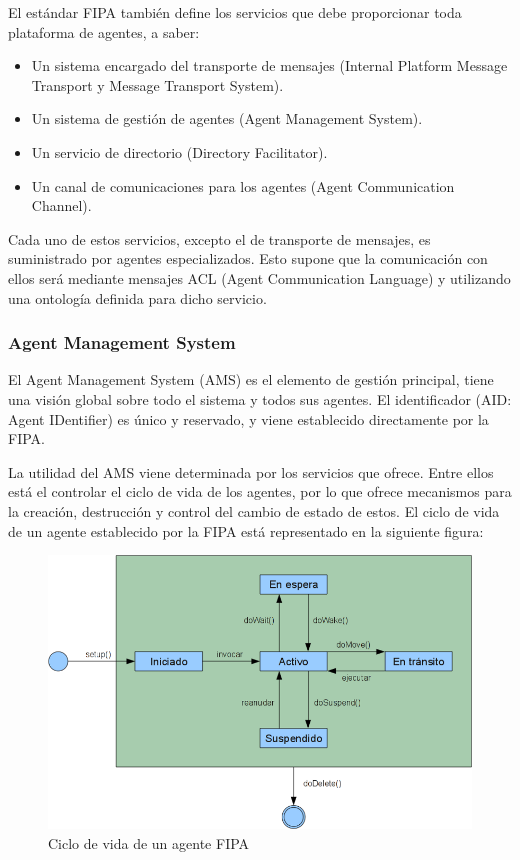 El estándar FIPA también define los servicios que debe proporcionar toda
plataforma de agentes, a saber:

\begin{itemize}
 \item Un sistema encargado del transporte de mensajes (Internal Platform
 Message Transport y Message Transport System).
 \item Un sistema de gestión de agentes (Agent Management System).
 \item Un servicio de directorio (Directory Facilitator).
 \item Un canal de comunicaciones para los agentes (Agent Communication
 Channel).
\end{itemize}

Cada uno de estos servicios, excepto el de transporte de mensajes, es
suministrado por agentes especializados. Esto supone que la comunicación con
ellos será mediante mensajes ACL (Agent Communication Language) y utilizando una
ontología definida para dicho servicio.

\subsubsection{Agent Management System}

El Agent Management System (AMS) es el elemento de gestión principal, tiene una
visión global sobre todo el sistema y todos sus agentes. El identificador (AID:
Agent IDentifier) es único y reservado, y viene establecido directamente por la
FIPA.

La utilidad del AMS viene determinada por los servicios que ofrece. Entre ellos
está el controlar el ciclo de vida de los agentes, por lo que ofrece mecanismos
para la creación, destrucción y control del cambio de estado de estos. El ciclo
de vida de un agente establecido por la FIPA está representado en la siguiente
figura:

\begin{figure}[H]
 \centering
 \includegraphics[width=130mm]{figuras/cap4/fipa_agent.png}
 \caption{Ciclo de vida de un agente FIPA}
\end{figure}

